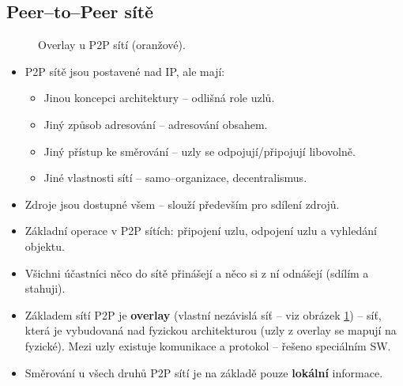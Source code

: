 \documentclass[11pt,a4paper]{article}
\begin{document}
\subsection{Peer--to--Peer sítě}
\begin{figure}[h!]
\begin{center}
\caption{Overlay u P2P sítí (oranžové).}
\label{p2p_overlay}
\end{center}
\end{figure}
\begin{itemize}
\item P2P sítě jsou postavené nad IP, ale mají:
\begin{itemize}
\item Jinou koncepci architektury -- odlišná role uzlů.
\item Jiný způsob adresování -- adresování obsahem.
\item Jiný přístup ke směrování -- uzly se odpojují/připojují libovolně.
\item Jiné vlastnosti sítí -- samo--organizace, decentralismus.
\end{itemize}
\item Zdroje jsou dostupné všem -- slouží především pro sdílení zdrojů.
\item Základní operace v P2P sítích: připojení uzlu, odpojení uzlu a vyhledání objektu.
\item Všichni účastníci něco do sítě přinášejí a něco si z ní odnášejí (sdílím a stahuji).
\item Základem sítí P2P je \textbf{overlay} (vlastní nezávislá síť -- viz obrázek \ref{p2p_overlay}) -- síť, která je vybudovaná nad fyzickou architekturou (uzly z overlay se mapují na fyzické). Mezi uzly existuje komunikace a protokol -- řešeno speciálním SW.
\item Směrování u všech druhů P2P sítí je na základě pouze \textbf{lokální} informace.
\end{itemize}
\end{document}
